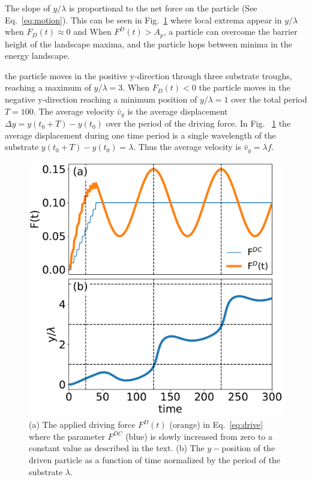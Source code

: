 \documentclass[twocolumn,preprintnumbers,amsmath,amssymb,aps,prx]{revtex4}
\begin{document}
The slope of $y/\lambda$
is proportional to the net force on the particle (See Eq.~\ref{eq:motion}).
This can be seen in 
Fig.~\ref{fig:0} %
where local extrema appear in $y/\lambda$
when $F_{D}(t) \approx 0 $ and 
When $F^D(t) > A_p$, a particle can 
overcome the barrier height of the landscape maxima,
and 
the particle hops between minima in the energy landscape.



the particle moves
in the positive y-direction
through three
substrate troughs, reaching a maximum of $y/\lambda = 3$.
When $F_{D}(t) < 0 $
the particle moves in the negative y-direction
reaching a minimum position
of $y/\lambda = 1$
over the total period $T = 100$.
The average velocity $\bar{v}_y$
is the average displacement $\Delta y = y(t_0+T) - y(t_0)$
over the period of the driving force.
In Fig. ~\ref{fig:0}
the average displacement during one time period is a single wavelength
of the substrate $y(t_0+T) - y(t_0) = \lambda$.
Thus the average velocity 
is $\bar{v}_y = \lambda f$. %


\begin{center}
\begin{figure}[h!]
\centering
\includegraphics[width=\columnwidth]{single_particle.pdf}
\caption{(a) The applied driving force $F^D(t)$ (orange) in Eq.~\ref{eq:drive}
  where the parameter $F^{DC}$ (blue) is slowly increased from zero to a constant value
  as described in the text.  (b) 
  The $y-$position of the driven particle as a function of time %
  normalized by the period of the substrate $\lambda$.
  }
\label{fig:0}
\end{figure}
\end{center}
\end{document}
